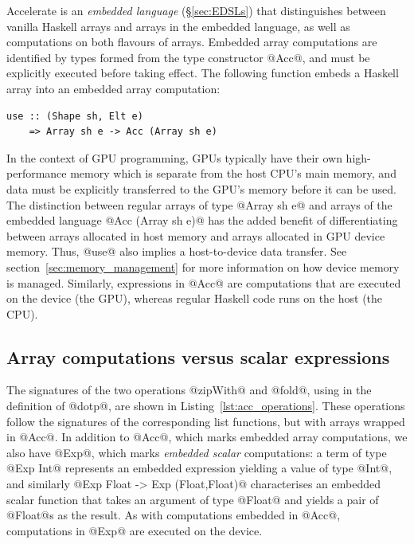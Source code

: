 Accelerate is an \emph{embedded language} (\S\ref{sec:EDSLs}) that distinguishes
between vanilla Haskell arrays and arrays in the embedded language, as well as
computations on both flavours of arrays. Embedded array computations are
identified by types formed from the type constructor @Acc@, and must be
explicitly executed before taking effect. The following function embeds a
Haskell array into an embedded array computation:
%
\begin{lstlisting}[style=haskell]
use :: (Shape sh, Elt e)
    => Array sh e -> Acc (Array sh e)
\end{lstlisting}
%
In the context of GPU programming, GPUs typically have their own
high-performance memory which is separate from the host CPU's main memory, and
data must be explicitly transferred to the GPU's memory before it can be used.
The distinction between regular arrays of type @Array sh e@ and arrays of the
embedded language @Acc (Array sh e)@ has the added benefit of differentiating
between arrays allocated in host memory and arrays allocated in GPU device
memory. Thus, @use@ also implies a host-to-device data transfer. See
section~\ref{sec:memory_management} for more information on how device memory is
managed. Similarly, expressions in @Acc@ are computations that are executed on
the device (the GPU), whereas regular Haskell code runs on the host (the CPU).


\subsection{Array computations versus scalar expressions}
\label{sec:array_computations_vs_scalar_expressions}

The signatures of the two operations @zipWith@ and @fold@, using in the
definition of @dotp@, are shown in Listing~\ref{lst:acc_operations}. These
operations follow the signatures of the corresponding list functions, but with
arrays wrapped in @Acc@. In addition to @Acc@, which marks embedded array
computations, we also have @Exp@, which marks \emph{embedded scalar}
computations: a term of type @Exp Int@ represents an embedded expression
yielding a value of type @Int@, and similarly @Exp Float -> Exp (Float,Float)@
characterises an embedded scalar function that takes an argument of type @Float@
and yields a pair of @Float@s as the result. As with computations embedded in
@Acc@, computations in @Exp@ are executed on the device.

